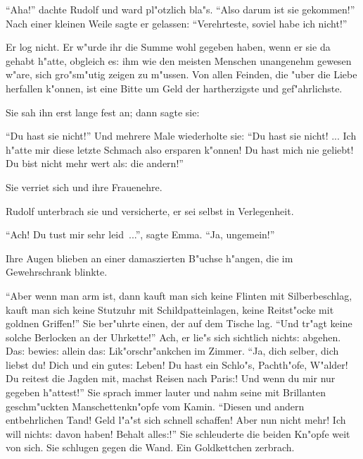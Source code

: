 \documentclass[oneside,12pt]{book}
\newcommand{\s}{s:}%
\begin{document}
"`Aha!"' dachte Rudolf und ward pl"otzlich bla"s. "`Also darum ist
sie gekommen!"' Nach einer kleinen Weile sagte er gelassen:
"`Verehrteste, soviel habe ich nicht!"'

Er log nicht. Er w"urde ihr die Summe wohl gegeben haben, wenn er
sie da gehabt h"atte, obgleich e{\s} ihm wie den meisten Menschen
unangenehm gewesen w"are, sich gro"sm"utig zeigen zu m"ussen. Von
allen Feinden, die "uber die Liebe herfallen k"onnen, ist eine
Bitte um Geld der hartherzigste und gef"ahrlichste.

Sie sah ihn erst lange fest an; dann sagte sie:

"`Du hast sie nicht!"' Und mehrere Male wiederholte sie: "`Du hast
sie nicht! ... Ich h"atte mir diese letzte Schmach also ersparen
k"onnen! Du hast mich nie geliebt! Du bist nicht mehr wert al{\s}
die andern!"'

Sie verriet sich und ihre Frauenehre.

Rudolf unterbrach sie und versicherte, er sei selbst in
Verlegenheit.

"`Ach! Du tust mir sehr leid~..."', sagte Emma. "`Ja, ungemein!"'

Ihre Augen blieben an einer damas\/zierten B"uchse h"angen, die im
Gewehrschrank blinkte.

"`Aber wenn man arm ist, dann kauft man sich keine Flinten mit
Silberbeschlag, kauft man sich keine Stutzuhr mit
Schildpatteinlagen, keine Reitst"ocke mit goldnen Griffen!"' Sie
ber"uhrte einen, der auf dem Tische lag. "`Und tr"agt keine solche
Berlocken an der Uhrkette!"' Ach, er lie"s sich sichtlich
nicht{\s} abgehen. Da{\s} bewie{\s} allein da{\s}
Lik"orschr"ankchen im Zimmer. "`Ja, dich selber, dich liebst du!
Dich und ein gute{\s} Leben! Du hast ein Schlo"s, Pachth"ofe,
W"alder! Du reitest die Jagden mit, machst Reisen nach Pari{\s}!
Und wenn du mir nur \so{da{\s}} gegeben h"attest!"' Sie sprach
immer lauter und nahm seine mit Brillanten geschm"uckten
Manschettenkn"opfe vom Kamin. "`Diesen und andern entbehrlichen
Tand! Geld l"a"st sich schnell schaffen! Aber nun nicht mehr! Ich
will nicht{\s} davon haben! Behalt alle{\s}!"' Sie schleuderte die
beiden Kn"opfe weit von sich. Sie schlugen gegen die Wand. Ein
Goldkettchen zerbrach.
\end{document}
